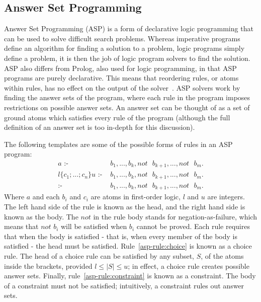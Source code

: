 \documentclass[../interim.tex]{subfiles}
\begin{document}
\subsection{Answer Set Programming}

Answer Set Programming (ASP) is a form of declarative logic programming that can be used to solve difficult search problems. Whereas imperative programs define an algorithm for finding a solution to a problem, logic programs simply define a problem, it is then the job of logic program solvers to find the solution. ASP also differs from Prolog, also used for logic programming, in that ASP programs are purely declarative. This means that reordering rules, or atoms within rules, has no effect on the output of the solver~\cite{asp-primer}. ASP solvers work by finding the answer sets of the program, where each rule in the program imposes restrictions on possible answer sets. An answer set can be thought of as a set of ground atoms which satisfies every rule of the program (although the full definition of an answer set is too in-depth for this discussion).

The following templates are some of the possible forms of rules in an ASP program:
\begin{align}
  a \text{ :- }& b_1, ..., b_k, not \text{ } b_{k+1}, ..., not \text{ } b_m. \label{asp-rule:normal}\\
  l \{c_1;...;c_n\} u \text{ :- }& b_1,...,b_k, not \text{ } b_{k+1}, ..., not \text{ } b_m. \label{asp-rule:choice}\\
  \text{:- }& b_1,...,b_k, not \text{ } b_{k+1}, ..., not \text{ } b_m. \label{asp-rule:constraint}
\end{align}
\noindent
{\footnotesize Where $a$ and each $b_i$ and $c_i$ are atoms in first-order logic, $l$ and $u$ are integers.} \\

The left hand side of the rule is known as the head, and the right hand side is known as the body. The $not$ in the rule body stands for negation-as-failure, which means that $not$ $b_i$ will be satisfied when $b_i$ cannot be proved. Each rule requires that when the body is satisfied - that is, when every member of the body is satisfied - the head must be satisfied. Rule~\ref{asp-rule:choice} is known as a choice rule. The head of a choice rule can be satisfied by any subset, $S$, of the atoms inside the brackets, provided $l \leq |S| \leq u$; in effect, a choice rule creates possible answer sets. Finally, rule~\ref{asp-rule:constraint} is known as a constraint. The body of a constraint must not be satisfied; intuitively, a constraint rules out answer sets.
\end{document}
